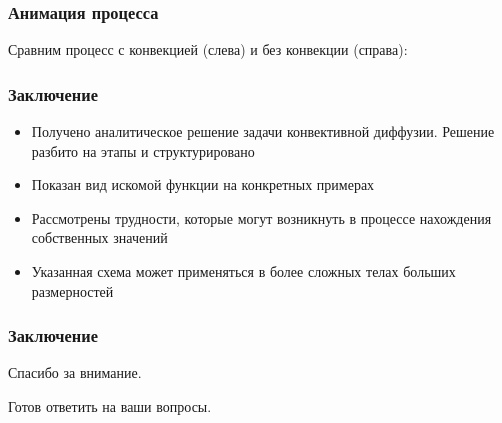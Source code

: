 \documentclass[10pt,pdf,hyperref={unicode}]{beamer}
\begin{document}

\begin{frame}
 \frametitle{Анимация процесса}
 Сравним процесс с конвекцией (слева) и без конвекции (справа):
 \begin{center}
 \end{center}
\end{frame}

\begin{frame}
  \frametitle{Заключение}
  \begin{itemize}
    \item Получено аналитическое решение задачи конвективной диффузии. Решение разбито на этапы и структурировано
    \item Показан вид искомой функции на конкретных примерах
    \item Рассмотрены трудности, которые могут возникнуть в процессе нахождения собственных значений
    \item Указанная схема может применяться в более сложных телах больших размерностей
  \end{itemize}
\end{frame}

\begin{frame}
  \frametitle{Заключение}
  \begin{center}
    Спасибо за внимание.

    Готов ответить на ваши вопросы.
  \end{center}
\end{frame}
\end{document}
